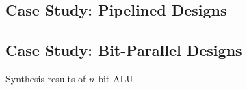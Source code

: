 \subsection{Case Study: Pipelined Designs}\label{sec:results:retiming}
\begin{table}[t]
    \centering
    \caption{}\label{tab:multiply}
\end{table}

\subsection{Case Study: Bit-Parallel Designs}\label{sec:results:scalability}
\begin{table}
    \centering
    \caption{Synthesis results of $n$-bit ALU}\label{tab:alu}
\end{table}
